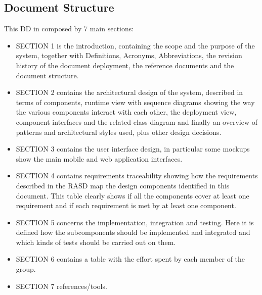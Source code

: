 	\subsection{Document Structure}
	This DD in composed by 7 main sections:
	\begin {itemize}
	 	\item SECTION 1 is the introduction, containing the scope and the purpose of the system, together with Definitions, Acronyms, Abbreviations, the revision history of the document deployment, the reference documents and the document structure.
		\item SECTION 2 contains the architectural design of the system, described in terms of components, runtime view with sequence diagrams showing the way the various components interact with each other, the deployment view, component interfaces and the related class diagram and finally an overview of patterns and architectural styles used, plus other design decisions.
		\item SECTION 3 contains the user interface design, in particular some mockups show the main mobile and web application interfaces.
		\item SECTION 4 contains requirements traceability showing how the requirements described in the RASD map the design components identified in this document. This table clearly shows if all the components cover at least one requirement and if each requirement is met by at least one component.
		\item SECTION 5 concerns the implementation, integration and testing. Here it is defined how the subcomponents should be implemented and integrated and which kinds of tests should be carried out on them.
		\item SECTION 6 contains a table with the effort spent by each member of the group.
		\item SECTION 7 references/tools.
	\end{itemize}
	
